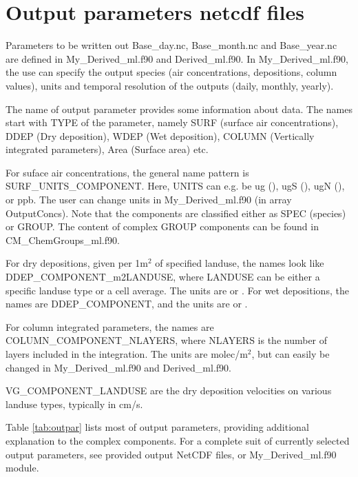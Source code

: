 
\newpage
\section{Output parameters netcdf files}\label{sec:OutputParam}

Parameters to be written out Base\_day.nc, Base\_month.nc and Base\_year.nc are defined in
My\_Derived\-\_ml.f90 and Derived\_ml.f90. In My\_Derived\_ml.f90, the
use can specify the output species (air concentrations, depositions,
column values), units and temporal resolution of the outputs (daily,
monthly, yearly).

The name of output parameter provides some information about data. The
names start with TYPE of the parameter, namely SURF (surface air
concentrations), DDEP (Dry deposition), WDEP (Wet deposition), COLUMN
(Vertically integrated parameters), Area (Surface area) etc.   

For suface air concentrations, the general name pattern is
SURF\_UNITS\_COMPONENT. Here, UNITS can e.g. be ug (\ug), ugS (\ugS),
ugN (\ugN), or ppb. The user can change units in My\_Derived\_ml.f90
(in array OutputConcs). Note that the components are classified either
as SPEC (species) or GROUP. The content of complex GROUP components
can be found in CM\_ChemGroups\-\_ml.f90.

For dry depositions, given per 1m$^{2}$ of specified landuse, the
names look like  DDEP\_COMPONENT\-\_m2\-LAND\-USE, where LANDUSE can be
either a specific landuse type or a cell average. The units are \mgSm
or \mgNm. For wet depositions, the names are DDEP\_COMPONENT, and the
units are \mgSl or \mgNl.

For column integrated parameters, the names are
COLUMN\_COMPONENT\_NLAYERS, where NLAYERS is the number of layers
included in the integration. The units are molec/m$^2$, but can easily
be changed in My\_Derived\_ml.f90 and Derived\_ml.f90.

VG\_COMPONENT\_LANDUSE are the dry deposition velocities on various
landuse types, typically in cm/s.


Table \ref{tab:outpar} lists most of output parameters, providing
additional explanation to the complex components. For a complete suit
of currently selected output parameters, see provided output
NetCDF files, or My\_Derived\_ml.f90 module.


